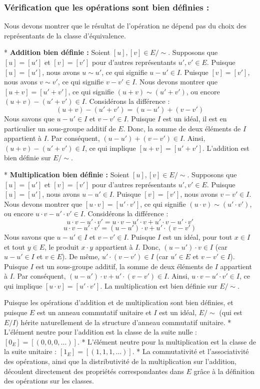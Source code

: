 \documentclass{report}
\begin{document}
\subsubsection*{Vérification que les opérations sont bien définies :}
Nous devons montrer que le résultat de l'opération ne dépend pas du choix des représentants de la classe d'équivalence.

*   \textbf{Addition bien définie :}
    Soient $[u], [v] \in E/\sim$. Supposons que $[u] = [u']$ et $[v] = [v']$ pour d'autres représentants $u', v' \in E$.
    Puisque $[u] = [u']$, nous avons $u \sim u'$, ce qui signifie $u-u' \in I$.
    Puisque $[v] = [v']$, nous avons $v \sim v'$, ce qui signifie $v-v' \in I$.
    Nous devons montrer que $[u+v] = [u'+v']$, ce qui signifie $(u+v) \sim (u'+v')$, ou encore $(u+v) - (u'+v') \in I$.
    Considérons la différence :
    $$ (u+v) - (u'+v') = (u-u') + (v-v') $$
    Nous savons que $u-u' \in I$ et $v-v' \in I$.
    Puisque $I$ est un idéal, il est en particulier un sous-groupe additif de $E$. Donc, la somme de deux éléments de $I$ appartient à $I$.
    Par conséquent, $(u-u') + (v-v') \in I$.
    Ainsi, $(u+v) - (u'+v') \in I$, ce qui implique $[u+v] = [u'+v']$.
    L'addition est bien définie sur $E/\sim$.

*   \textbf{Multiplication bien définie :}
    Soient $[u], [v] \in E/\sim$. Supposons que $[u] = [u']$ et $[v] = [v']$ pour d'autres représentants $u', v' \in E$.
    Puisque $[u] = [u']$, nous avons $u-u' \in I$.
    Puisque $[v] = [v']$, nous avons $v-v' \in I$.
    Nous devons montrer que $[u \cdot v] = [u' \cdot v']$, ce qui signifie $(u \cdot v) \sim (u' \cdot v')$, ou encore $u \cdot v - u' \cdot v' \in I$.
    Considérons la différence :
    $$ u \cdot v - u' \cdot v' = u \cdot v - u' \cdot v + u' \cdot v - u' \cdot v' $$
    $$ u \cdot v - u' \cdot v' = (u-u') \cdot v + u' \cdot (v-v') $$
    Nous savons que $u-u' \in I$ et $v-v' \in I$.
    Puisque $I$ est un idéal, pour tout $x \in I$ et tout $y \in E$, le produit $x \cdot y$ appartient à $I$.
    Donc, $(u-u') \cdot v \in I$ (car $u-u' \in I$ et $v \in E$).
    De même, $u' \cdot (v-v') \in I$ (car $u' \in E$ et $v-v' \in I$).
    Puisque $I$ est un sous-groupe additif, la somme de deux éléments de $I$ appartient à $I$.
    Par conséquent, $(u-u') \cdot v + u' \cdot (v-v') \in I$.
    Ainsi, $u \cdot v - u' \cdot v' \in I$, ce qui implique $[u \cdot v] = [u' \cdot v']$.
    La multiplication est bien définie sur $E/\sim$.

Puisque les opérations d'addition et de multiplication sont bien définies, et puisque $E$ est un anneau commutatif unitaire et $I$ est un idéal, $E/\sim$ (qui est $E/I$) hérite naturellement de la structure d'anneau commutatif unitaire.
*   L'élément neutre pour l'addition est la classe de la suite nulle : $[0_E] = [(0,0,0,\dots)]$.
*   L'élément neutre pour la multiplication est la classe de la suite unitaire : $[1_E] = [(1,1,1,\dots)]$.
*   La commutativité et l'associativité des opérations, ainsi que la distributivité de la multiplication sur l'addition, découlent directement des propriétés correspondantes dans $E$ grâce à la définition des opérations sur les classes.
\end{document}
